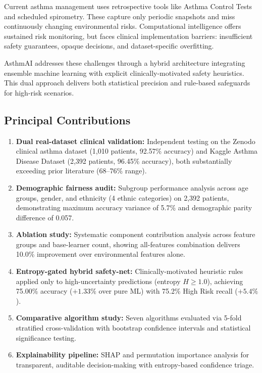 \documentclass[11pt,a4paper]{article}
\begin{document}
Current asthma management uses retrospective tools like Asthma Control Tests and
scheduled spirometry. These capture only periodic snapshots and miss continuously
changing environmental risks. Computational intelligence offers sustained risk monitoring,
but faces clinical implementation barriers: insufficient safety guarantees, opaque
decisions, and dataset-specific overfitting.

AsthmAI addresses these challenges through a hybrid architecture integrating ensemble
machine learning with explicit clinically-motivated safety heuristics. This dual approach
delivers both statistical precision and rule-based safeguards for high-risk scenarios.

\subsection{Principal Contributions}

\begin{enumerate}
  \item \textbf{Dual real-dataset clinical validation:} Independent testing on the Zenodo
        clinical asthma dataset (1,010 patients, 92.57\% accuracy) and Kaggle Asthma Disease
        Dataset (2,392 patients, 96.45\% accuracy), both substantially exceeding prior
        literature (68--76\% range).
  \item \textbf{Demographic fairness audit:} Subgroup performance analysis across age groups,
        gender, and ethnicity (4 ethnic categories) on 2,392 patients, demonstrating maximum
        accuracy variance of 5.7\% and demographic parity difference of 0.057.
  \item \textbf{Ablation study:} Systematic component contribution analysis across feature
        groups and base-learner count, showing all-features combination delivers 10.0\%
        improvement over environmental features alone.
  \item \textbf{Entropy-gated hybrid safety-net:} Clinically-motivated heuristic rules
        applied only to high-uncertainty predictions (entropy $H \geq 1.0$), achieving
        75.00\% accuracy ($+1.33\%$ over pure ML) with 75.2\% High Risk recall ($+5.4\%$).
  \item \textbf{Comparative algorithm study:} Seven algorithms evaluated via 5-fold stratified
        cross-validation with bootstrap confidence intervals and statistical significance testing.
  \item \textbf{Explainability pipeline:} SHAP and permutation importance analysis for
        transparent, auditable decision-making with entropy-based confidence triage.
\end{enumerate}
\end{document}
